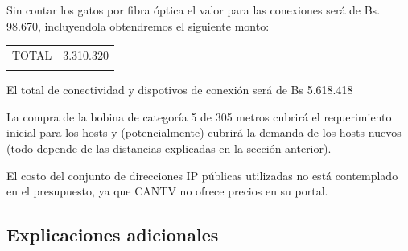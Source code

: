 \documentclass[]{article}
\begin{document}
Sin contar los gatos por fibra óptica el valor para las conexiones será
de Bs. 98.670, incluyendola obtendremos el siguiente monto:

\begin{longtable}[c]{@{}ll@{}}
\toprule\addlinespace
\begin{minipage}[t]{0.18\columnwidth}\raggedright
TOTAL
\end{minipage} & \begin{minipage}[t]{0.21\columnwidth}\raggedright
3.310.320
\end{minipage}
\\\addlinespace
\bottomrule
\end{longtable}

El total de conectividad y dispotivos de conexión será de Bs 5.618.418

La compra de la bobina de categoría 5 de 305 metros cubrirá el
requerimiento inicial para los hosts y (potencialmente) cubrirá la
demanda de los hosts nuevos (todo depende de las distancias explicadas
en la sección anterior).

El costo del conjunto de direcciones IP públicas utilizadas no está
contemplado en el presupuesto, ya que CANTV no ofrece precios en su
portal.

\subsection{Explicaciones adicionales}\label{explicaciones-adicionales}
\end{document}
